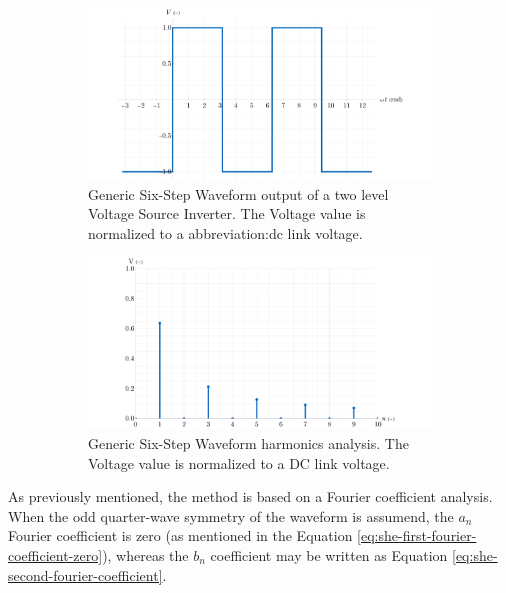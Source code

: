 \documentclass[a4paper, twoside, 11pt]{article}
\begin{document}
            \begin{figure}[htbp!]
                \centering
                \begin{subfigure}[t]{0.45\textwidth}
                    \includegraphics[width=1\textwidth]{src/png/SixStepPlotWaveform.png}
                    \caption{Generic Six-Step Waveform output of a two level Voltage Source Inverter. The Voltage value is normalized to a \gls{abbreviation:dc} link voltage.}
                    \label{fig:SixStepPlotWaveform}
                \end{subfigure}
                \hspace{0.05\textwidth}
                \begin{subfigure}[t]{0.45\textwidth}
                    \includegraphics[width=1\textwidth]{src/png/SixStepPlotHarmonics.png}
                    \caption{Generic Six-Step Waveform harmonics analysis. The Voltage value is normalized to a DC link voltage.}
                    \label{fig:SixStepPlotHarmonics}
                \end{subfigure}
                \caption{}
            \end{figure}
            \FloatBarrier
            As previously mentioned, the method is based on a Fourier coefficient analysis. When the odd quarter-wave symmetry of the waveform is assumend, the $a_n$ Fourier coefficient is zero (as mentioned in the Equation \ref{eq:she-first-fourier-coefficient-zero}), whereas the $b_n$ coefficient may be written as Equation \ref{eq:she-second-fourier-coefficient}.
\end{document}

